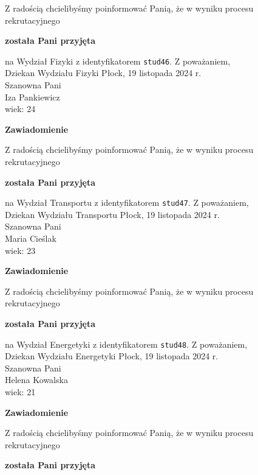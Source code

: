 \documentclass[12pt,a4paper]{article}
\begin{document}
\bigskip 
Z radością chcielibyśmy poinformować Panią, że w wyniku procesu rekrutacyjnego
\begin{center}
\textsf{\textbf{została Pani przyjęta}}
\end{center}
na Wydział Fizyki z identyfikatorem \verb|stud46|. 
\vspace{2cm}
\noindent
Z poważaniem, \\
Dziekan
Wydziału Fizyki
\newpage
\hfill Płock, 19 listopada 2024 r. \\
\noindent
Szanowna Pani \\
Iza Pankiewicz \\
wiek: 24
\bigskip
\begin{center}
    {\Large\textbf{Zawiadomienie}}
\end{center}
\bigskip 
Z radością chcielibyśmy poinformować Panią, że w wyniku procesu rekrutacyjnego
\begin{center}
\textsf{\textbf{została Pani przyjęta}}
\end{center}
na Wydział Transportu z identyfikatorem \verb|stud47|. 
\vspace{2cm}
\noindent
Z poważaniem, \\
Dziekan
Wydziału Transportu
\newpage
\hfill Płock, 19 listopada 2024 r. \\
\noindent
Szanowna Pani \\
Maria Cieślak \\
wiek: 23
\bigskip
\begin{center}
    {\Large\textbf{Zawiadomienie}}
\end{center}
\bigskip 
Z radością chcielibyśmy poinformować Panią, że w wyniku procesu rekrutacyjnego
\begin{center}
\textsf{\textbf{została Pani przyjęta}}
\end{center}
na Wydział Energetyki z identyfikatorem \verb|stud48|. 
\vspace{2cm}
\noindent
Z poważaniem, \\
Dziekan
Wydziału Energetyki
\newpage
\hfill Płock, 19 listopada 2024 r. \\
\noindent
Szanowna Pani \\
Helena Kowalska \\
wiek: 21
\bigskip
\begin{center}
    {\Large\textbf{Zawiadomienie}}
\end{center}
\bigskip 
Z radością chcielibyśmy poinformować Panią, że w wyniku procesu rekrutacyjnego
\begin{center}
\textsf{\textbf{została Pani przyjęta}}
\end{center}
\end{document}
